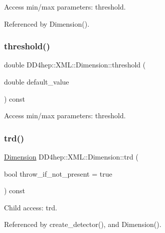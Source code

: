 Access min/max parameters\+: threshold. 



Referenced by Dimension().

\hypertarget{struct_d_d4hep_1_1_x_m_l_1_1_dimension_a80839185976256eeb128fd101e1dd285}{}\label{struct_d_d4hep_1_1_x_m_l_1_1_dimension_a80839185976256eeb128fd101e1dd285} 
\subsubsection{\texorpdfstring{threshold()}{threshold()}\hspace{0.1cm}{\footnotesize\ttfamily [2/2]}}
{\footnotesize\ttfamily double D\+D4hep\+::\+X\+M\+L\+::\+Dimension\+::threshold (\begin{DoxyParamCaption}\item[{double}]{default\+\_\+value }\end{DoxyParamCaption}) const}



Access min/max parameters\+: threshold. 

\hypertarget{struct_d_d4hep_1_1_x_m_l_1_1_dimension_a25743826632c3f80843d1bc777cd6596}{}\label{struct_d_d4hep_1_1_x_m_l_1_1_dimension_a25743826632c3f80843d1bc777cd6596} 
\subsubsection{\texorpdfstring{trd()}{trd()}}
{\footnotesize\ttfamily \hyperlink{struct_d_d4hep_1_1_x_m_l_1_1_dimension}{Dimension} D\+D4hep\+::\+X\+M\+L\+::\+Dimension\+::trd (\begin{DoxyParamCaption}\item[{bool}]{throw\+\_\+if\+\_\+not\+\_\+present = {\ttfamily true} }\end{DoxyParamCaption}) const}



Child access\+: trd. 



Referenced by create\+\_\+detector(), and Dimension().

\hypertarget{struct_d_d4hep_1_1_x_m_l_1_1_dimension_a80cc1ac3f322e6316b98f4332e8211d6}{}\label{struct_d_d4hep_1_1_x_m_l_1_1_dimension_a80cc1ac3f322e6316b98f4332e8211d6} 
